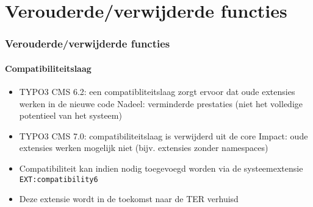 %

\section{Verouderde/verwijderde functies}


\begin{frame}[fragile]
	\frametitle{Verouderde/verwijderde functies}
	\framesubtitle{Compatibiliteitslaag}

	\begin{itemize}

		\item TYPO3 CMS 6.2: een compatibliteitslaag zorgt ervoor dat oude extensies werken in de nieuwe code\newline
			\small
				Nadeel: verminderde prestaties (niet het volledige potentieel van het systeem)
			\normalsize

		\item TYPO3 CMS 7.0: compatibiliteitslaag is verwijderd uit de core\newline
			\small
				Impact: oude extensies werken mogelijk niet (bijv. extensies zonder namespaces)
			\normalsize

		\item Compatibiliteit kan indien nodig toegevoegd worden via de systeemextensie \texttt{EXT:compatibility6}
		\item Deze extensie wordt in de toekomst naar de TER verhuisd

	\end{itemize}

\end{frame}

